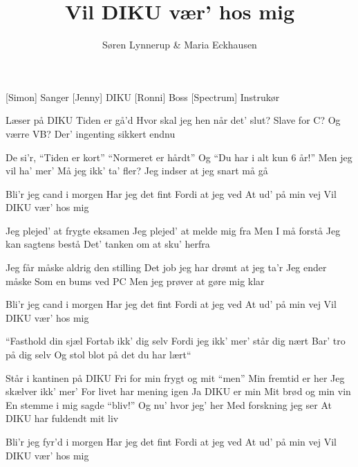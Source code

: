 \documentclass[a4paper,11pt]{article}
\title{Vil DIKU vær' hos mig}
\author{Søren Lynnerup \& Maria Eckhausen}
\begin{document}
\maketitle

\begin{roles}
[Simon] Sanger
[Jenny] DIKU
[Ronni] Boss
[Spectrum] Instrukør
\end{roles}

\begin{song}

 Læser på DIKU
Tiden er gå’d
Hvor skal jeg hen når det’ slut?
Slave for C?
Og værre VB?
Der’ ingenting sikkert endnu

 De si’r, “Tiden er kort”
“Normeret er hårdt”
Og “Du har i alt kun 6 år!”
Men jeg vil ha’ mer’
Må jeg ikk’ ta’ fler?
Jeg indser at jeg snart må gå

 Bli’r jeg cand i morgen
Har jeg det fint
Fordi at jeg ved
At ud’ på min vej
Vil DIKU vær’ hos mig

 Jeg plejed’ at frygte eksamen
Jeg plejed’ at melde mig fra
Men I må forstå
Jeg kan sagtens bestå
Det’ tanken om at sku’ herfra

 Jeg får måske aldrig den stilling
Det job jeg har drømt at jeg ta’r
Jeg ender måske
Som en bums ved PC
Men jeg prøver at gøre mig klar

 Bli’r jeg cand i morgen
Har jeg det fint
Fordi at jeg ved
At ud’ på min vej
Vil DIKU vær’ hos mig

“Fasthold din sjæl
Fortab ikk’ dig selv 
Fordi jeg ikk’ mer’ står dig nært
Bar’ tro på dig selv
Og stol blot på det du har lært“


 Står i kantinen på DIKU
Fri for min frygt og mit “men”
Min fremtid er her
Jeg skælver ikk’ mer’
For livet har mening igen
Ja DIKU er min
Mit brød og min vin
En stemme i mig sagde “bliv!”
Og nu’ hvor jeg’ her
Med forskning jeg ser
At DIKU har fuldendt mit liv

 Bli’r jeg fyr’d i morgen
Har jeg det fint
Fordi at jeg ved
At ud’ på min vej
Vil DIKU vær’ hos mig


\end{song}
\end{document}
